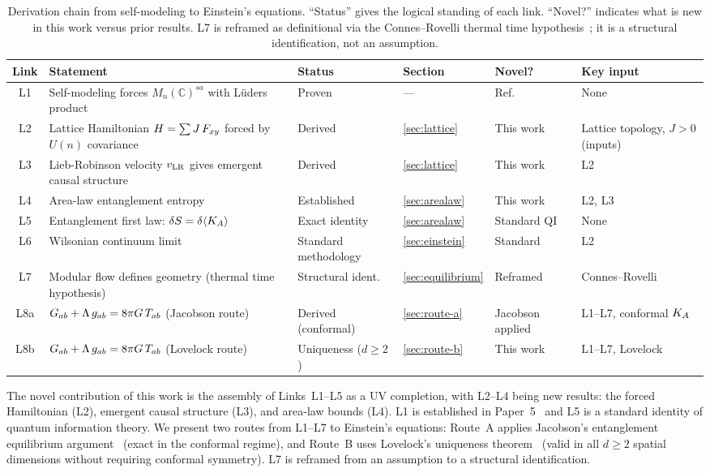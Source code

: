 \begin{table}
\caption{Derivation chain from self-modeling to Einstein's equations.
``Status'' gives the logical standing of each link. ``Novel?'' indicates
what is new in this work versus prior results. L7 is reframed as
definitional via the Connes--Rovelli thermal time
hypothesis~\cite{ConnesRovelli1994}; it is a structural identification, not an assumption.
\label{tab:chain}}
\begin{ruledtabular}
\begin{tabular}{clllll}
Link & Statement & Status & Section & Novel? & Key input \\ \hline
L1 & Self-modeling forces $M_n(\mathbb{C})^{sa}$ with L\"uders product
   & Proven & --- & Ref.~\cite{Paper5} & None \\
L2 & Lattice Hamiltonian $H = \sum J\,F_{xy}$ forced by $U(n)$ covariance
   & Derived & \ref{sec:lattice} & This work & Lattice topology, $J>0$ (inputs) \\
L3 & Lieb-Robinson velocity $v_{\mathrm{LR}}$ gives emergent causal structure
   & Derived & \ref{sec:lattice} & This work & L2 \\
L4 & Area-law entanglement entropy
   & Established & \ref{sec:arealaw} & This work & L2, L3 \\
L5 & Entanglement first law: $\delta S = \delta\langle K_A\rangle$
   & Exact identity & \ref{sec:arealaw} & Standard QI & None \\
L6 & Wilsonian continuum limit
   & Standard methodology & \ref{sec:einstein} & Standard & L2 \\
L7 & Modular flow defines geometry (thermal time hypothesis)
   & Structural ident.\ & \ref{sec:equilibrium} & Reframed
   & Connes--Rovelli~\cite{ConnesRovelli1994} \\
L8a & $G_{ab} + \Lambda\,g_{ab} = 8\pi G\,T_{ab}$ (Jacobson route)
   & Derived (conformal) & \ref{sec:route-a} & Jacobson~\cite{Jacobson2016} applied
   & L1--L7, conformal $K_A$ \\
L8b & $G_{ab} + \Lambda\,g_{ab} = 8\pi G\,T_{ab}$ (Lovelock route)
   & Uniqueness ($d \geq 2$) & \ref{sec:route-b} & This work
   & L1--L7, Lovelock~\cite{Lovelock1971} \\
\end{tabular}
\end{ruledtabular}
\end{table}

The novel contribution of this work is the assembly of Links~L1--L5 as
a UV completion, with L2--L4 being new results: the forced Hamiltonian
(L2), emergent causal structure (L3), and area-law bounds (L4).  L1 is
established in Paper~5~\cite{Paper5} and L5 is a standard identity of
quantum information theory.  We present two routes from L1--L7 to
Einstein's equations: Route~A applies Jacobson's entanglement
equilibrium argument~\cite{Jacobson2016} (exact in the conformal
regime), and Route~B uses Lovelock's uniqueness
theorem~\cite{Lovelock1971} (valid in all $d \geq 2$ spatial
dimensions without requiring conformal symmetry).  L7 is reframed from
an assumption to a structural identification.

